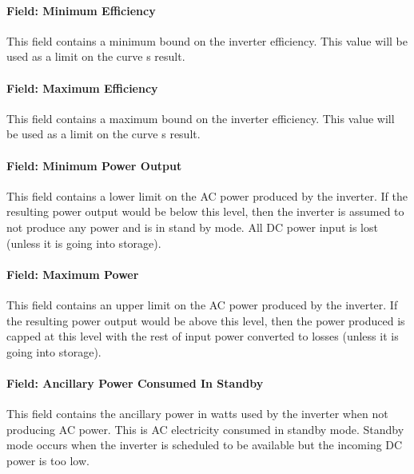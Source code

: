 \paragraph{Field: Minimum Efficiency}\label{field-minimum-efficiency}

This field contains a minimum bound on the inverter efficiency. This value will be used as a limit on the curve s result.

\paragraph{Field: Maximum Efficiency}\label{field-maximum-efficiency}

This field contains a maximum bound on the inverter efficiency. This value will be used as a limit on the curve s result.

\paragraph{Field: Minimum Power Output}\label{field-minimum-power-output}

This field contains a lower limit on the AC power produced by the inverter. If the resulting power output would be below this level, then the inverter is assumed to not produce any power and is in stand by mode. All DC power input is lost (unless it is going into storage).

\paragraph{Field: Maximum Power}\label{field-maximum-power}

This field contains an upper limit on the AC power produced by the inverter. If the resulting power output would be above this level, then the power produced is capped at this level with the rest of input power converted to losses (unless it is going into storage).

\paragraph{Field: Ancillary Power Consumed In Standby}\label{field-ancillary-power-consumed-in-standby}

This field contains the ancillary power in watts used by the inverter when not producing AC power. This is AC electricity consumed in standby mode. Standby mode occurs when the inverter is scheduled to be available but the incoming DC power is too low.

